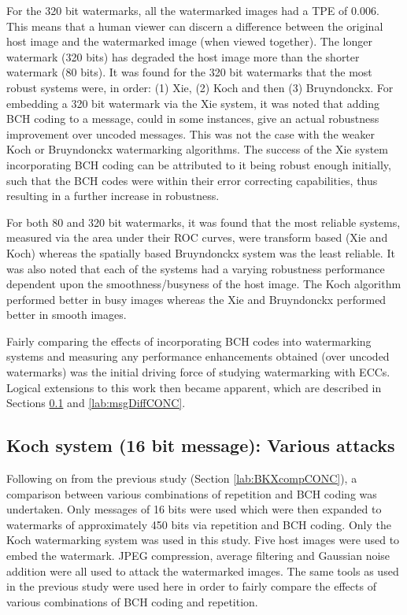 \documentclass[12pt]{report}
\begin{document}
For the 320 bit watermarks, all the watermarked images had a TPE of 0.006. This means that a human
viewer can discern a difference between the original host image and the watermarked image (when viewed together). The longer
watermark (320 bits) has degraded the host image more than the shorter watermark (80 bits). 
It was found for the 320 bit watermarks that the most 
robust systems were, in order: (1) Xie, (2) Koch and then (3) Bruyndonckx.
For embedding a 320 bit watermark via the Xie system, it was noted that adding BCH coding to a message, could in some instances, give an 
actual robustness improvement over uncoded messages. This was not the case with the weaker Koch or Bruyndonckx
watermarking algorithms. The success of the Xie system incorporating BCH coding can be attributed to it being robust enough initially,
such that the BCH codes were within their error correcting capabilities, thus resulting in a further increase in robustness.

For both 80 and 320 bit watermarks, it was found that the most reliable systems, measured via the area under their ROC
curves, were transform based (Xie and Koch) whereas
the spatially based Bruyndonckx system was the least reliable. It was also noted that each of the systems
had a varying robustness performance dependent upon the smoothness/busyness of the host image. The
Koch algorithm performed better in busy images whereas the Xie and Bruyndonckx performed better in smooth images.

	Fairly comparing the effects of incorporating BCH codes into watermarking systems and measuring
	any performance enhancements obtained (over uncoded watermarks) was the initial driving force 
	of studying watermarking with ECCs.
	Logical extensions to this work then became apparent, which are described in
	Sections \ref{lab:msg16CONC} and \ref{lab:msgDiffCONC}.

\subsection{Koch system (16 bit message): Various attacks}
	\label{lab:msg16CONC}
	Following on from the previous study (Section \ref{lab:BKXcompCONC}), a comparison between various combinations
	of repetition and BCH coding was undertaken. Only messages of 16 bits were used which
	were then expanded to watermarks of approximately 450 bits via repetition and BCH coding.
	Only the Koch watermarking system 
	was used in this study. Five host images were used to embed the watermark.
	JPEG compression, average filtering and Gaussian noise addition	were all used to attack
	the watermarked images. The same tools as used in the previous study were used here
	in order to fairly compare the effects of various combinations of BCH coding and repetition.
\end{document}
